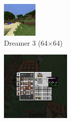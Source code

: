 \begin{figure}[h!]
\centering
\begin{subfigure}[b]{0.25\textwidth}
\includegraphics[width=\textwidth]{figures/inputs/image64}
\caption{Dreamer 3 (64$\times$64)}
\end{subfigure}\hfill%
\begin{subfigure}[b]{0.25\textwidth}
\includegraphics[width=\textwidth]{figures/inputs/image128}

\end{subfigure}
\end{figure}
